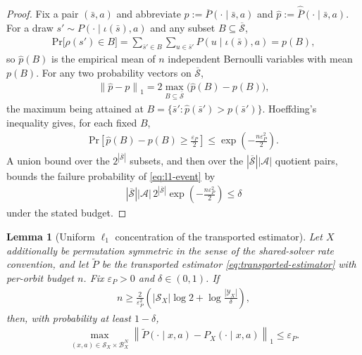 \documentclass{article}
\theoremstyle{plain}
\newtheorem{lemma}[theorem]{Lemma}
\theoremstyle{definition}
\theoremstyle{remark}
\renewcommand{\Pr}{\mathrm{Pr}}
\newcommand{\St}{\mathcal{S}}
\newcommand{\Ac}{\mathcal{A}}
\newcommand{\abs}[1]{\left\lvert#1\right\rvert}
\newcommand{\norm}[1]{\left\lVert#1\right\rVert}
\newcommand{\quotient}[1]{\overline{#1}}
\newcommand{\hatP}{\widehat{\quotient P}}
\newcommand{\trP}{\widetilde{P}}
\begin{document}
\begin{proof}
Fix a pair $(\bar s,a)$ and abbreviate
$p:=\quotient P(\cdot\mid\bar s,a)$ and $\hat p:=\hatP(\cdot\mid\bar s,a)$.
For a draw $s'\sim P(\cdot\mid\iota(\bar s),a)$ and any subset
$B\subseteq\quotient\St$,
\begin{align}
  \Pr\big[\rho(s')\in B\big]
  =
  \sum_{\bar s'\in B}\sum_{u\in\bar s'}P(u\mid\iota(\bar s),a)
  =
  p(B),
  \label{eq:pooled-unbiased}
\end{align}
so $\hat p(B)$ is the empirical mean of $n$ independent Bernoulli variables
with mean $p(B)$. For any two probability vectors on $\quotient\St$,
\begin{align*}
  \norm{\hat p-p}_1
  =
  2\max_{B\subseteq\quotient\St}
  \big(\hat p(B)-p(B)\big),
\end{align*}
the maximum being attained at
$B=\{\bar s':\hat p(\bar s')>p(\bar s')\}$. Hoeffding's inequality gives, for
each fixed $B$,
\begin{align*}
  \Pr\left[\hat p(B)-p(B)\ge\frac{\varepsilon_P}{2}\right]
  \le
  \exp\left(-\frac{n\varepsilon_P^2}{2}\right).
\end{align*}
A union bound over the $2^{\abs{\quotient\St}}$ subsets, and then over the
$\abs{\quotient\St}\abs\Ac$ quotient pairs, bounds the failure probability of
\eqref{eq:l1-event} by
\begin{align*}
  \abs{\quotient\St}\abs\Ac\,
  2^{\abs{\quotient\St}}
  \exp\left(-\frac{n\varepsilon_P^2}{2}\right)
  \le
  \delta
\end{align*}
under the stated budget.
\end{proof}

\begin{lemma}[Uniform $\ell_1$ concentration of the transported estimator]
\label{lemma:transport-concentration}
Let $X$ additionally be permutation symmetric in the sense of the
shared-solver rate convention, and let $\trP$ be the transported estimator
\eqref{eq:transported-estimator} with per-orbit budget $n$. Fix
$\varepsilon_P>0$ and $\delta\in(0,1)$. If
\begin{align*}
  n
  \ge
  \frac{2}{\varepsilon_P^2}
  \left(
    \abs{\mathcal S_X}\log2
    +\log\frac{\abs{\mathcal Y_X}}{\delta}
  \right),
\end{align*}
then, with probability at least $1-\delta$,
\begin{align}
  \max_{(x,a)\in\mathcal S_X\times\mathcal B_X^N}
  \norm{\trP(\cdot\mid x,a)-P_X(\cdot\mid x,a)}_1
  \le\varepsilon_P.
  \label{eq:transport-event}
\end{align}
\end{lemma}
\end{document}
